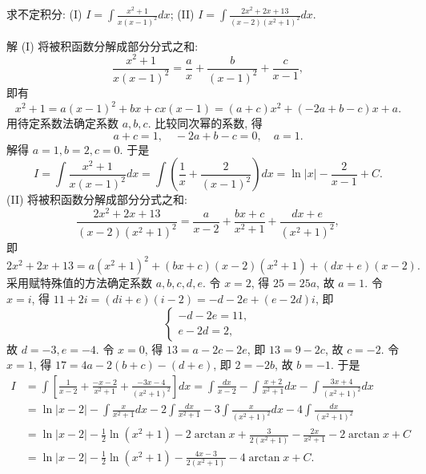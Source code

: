 \documentclass[lang=cn,newtx,10pt,scheme=chinese]{elegantbook}
\begin{document}
\begin{example}
  求不定积分: (I) $I = \int \frac{x^2 + 1}{x(x - 1)^2} dx$; (II) $I = \int \frac{2x^2 + 2x + 13}{(x - 2)(x^2 + 1)^2} dx$.
\end{example}
\begin{solution}
  解 (I) 将被积函数分解成部分分式之和:
  $$
  \frac{x^2 + 1}{x(x - 1)^2} = \frac{a}{x} + \frac{b}{(x - 1)^2} + \frac{c}{x - 1},
  $$
  即有
  $$
  x^2 + 1 = a(x - 1)^2 + bx + cx(x - 1) = (a + c)x^2 + (-2a + b - c)x + a.
  $$
  用待定系数法确定系数 $a, b, c$. 比较同次幂的系数, 得
  $$
  a + c = 1, \quad -2a + b - c = 0, \quad a = 1.
  $$
  解得 $a = 1, b = 2, c = 0$. 于是
  $$
  I = \int \frac{x^2 + 1}{x(x - 1)^2} dx = \int \left(\frac{1}{x} + \frac{2}{(x - 1)^2}\right) dx = \ln|x| - \frac{2}{x - 1} + C.
  $$
  (II) 将被积函数分解成部分分式之和:
  $$
  \frac{2x^2 + 2x + 13}{(x - 2)(x^2 + 1)^2} = \frac{a}{x - 2} + \frac{bx + c}{x^2 + 1} + \frac{dx + e}{(x^2 + 1)^2},
  $$
  即
  $$
  2x^2 + 2x + 13 = a(x^2 + 1)^2 + (bx + c)(x - 2)(x^2 + 1) + (dx + e)(x - 2).
  $$
  采用赋特殊值的方法确定系数 $a, b, c, d, e$.
  令 $x = 2$, 得 $25 = 25a$, 故 $a = 1$.
  令 $x = i$, 得 $11 + 2i = (di + e)(i - 2) = -d - 2e + (e - 2d)i$, 即
  $$
  \begin{cases} -d - 2e = 11, \\ e - 2d = 2, \end{cases}
  $$
  故 $d = -3, e = -4$.
  令 $x = 0$, 得 $13 = a - 2c - 2e$, 即 $13 = 9 - 2c$, 故 $c = -2$.
  令 $x = 1$, 得 $17 = 4a - 2(b + c) - (d + e)$, 即 $2 = -2b$, 故 $b = -1$.
  于是
  $$
  \begin{aligned}
  I &= \int \left[ \frac{1}{x - 2} + \frac{-x - 2}{x^2 + 1} + \frac{-3x - 4}{(x^2 + 1)^2} \right] dx = \int \frac{dx}{x - 2} - \int \frac{x + 2}{x^2 + 1} dx - \int \frac{3x + 4}{(x^2 + 1)^2} dx \\
  &= \ln|x - 2| - \int \frac{x}{x^2 + 1} dx - 2 \int \frac{dx}{x^2 + 1} - 3 \int \frac{x}{(x^2 + 1)^2} dx - 4 \int \frac{dx}{(x^2 + 1)^2} \\
  &= \ln|x - 2| - \frac{1}{2} \ln(x^2 + 1) - 2 \arctan x + \frac{3}{2(x^2 + 1)} - \frac{2x}{x^2 + 1} - 2 \arctan x + C \\
  &= \ln|x - 2| - \frac{1}{2} \ln(x^2 + 1) - \frac{4x - 3}{2(x^2 + 1)} - 4 \arctan x + C.
  \end{aligned}
  $$
\end{solution}
\end{document}
